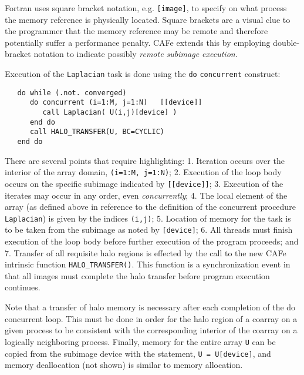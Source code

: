 Fortran uses square bracket notation, e.g. \texttt{[image]}, to specify on what process the
memory reference is physically located.  Square brackets are a visual clue to the
programmer that the memory reference may be remote and therefore potentially suffer a
performance penalty.  CAFe extends this by employing double-bracket notation to indicate
possibly \emph{remote subimage execution}.

Execution of the \texttt{Laplacian} task is done using the \texttt{do}
\texttt{concurrent} construct:
\begin{verbatim}
   do while (.not. converged)
      do concurrent (i=1:M, j=1:N)   [[device]]
         call Laplacian( U(i,j)[device] )
      end do
      call HALO_TRANSFER(U, BC=CYCLIC)
   end do
\end{verbatim}
There are several points that require highlighting: 1. Iteration occurs over the interior
of the array domain, \texttt{(i=1:M, j=1:N)}; 2. Execution of the loop body occurs on the
specific subimage indicated by \texttt{[[device]]}; 3. Execution of the iterates may occur
in any order, even \emph{concurrently}; 4. The local element of the array (as
defined above in reference to the definition of the concurrent procedure
\texttt{Laplacian}) is given by the indices \texttt{(i,j)}; 5. Location of memory for the
task is to be taken from the subimage as noted by \texttt{[device]}; 6. All threads must finish
execution of the loop body before further execution of the program proceeds; and 7. Transfer of
all requisite halo regions is effected by the call to the new CAFe intrinsic function
\texttt{HALO\_TRANSFER()}.  This function is a synchronization event in that all images must
complete the halo transfer before program execution continues.

Note that a transfer of halo memory is necessary after each completion of the do concurrent loop.
This must be done in order for the halo region of a coarray on a given process to be consistent
with the corresponding interior of the coarray on a logically neighboring process.
Finally, memory for the entire array \texttt{U} can be copied from the
subimage device with the statement,
\texttt{U = U[device]}, 
and memory deallocation (not shown) is similar to memory allocation.



